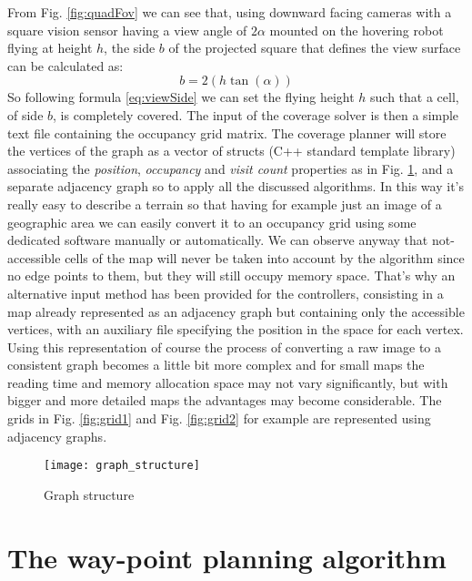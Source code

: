 From Fig. \ref{fig:quadFov} we can see that, using downward facing cameras with a square vision sensor having a view angle of $2\alpha$ mounted on the hovering robot flying at height $h$, the side $b$ of the projected square that defines the view surface can be calculated as:
\begin{equation}
b = 2(h \tan(\alpha))
\label{eq:viewSide}
\end{equation}
So following formula \ref{eq:viewSide} we can set the flying height $h$ such that a cell, of side $b$, is completely covered. 
The input of the coverage solver is then a simple text file containing the occupancy grid matrix. The coverage planner will store the vertices of the graph as a vector of structs (C++ standard template library) associating the \emph{position}, \emph{occupancy} and \emph{visit count} properties as in Fig. \ref{fig:graph_struct}, and a separate adjacency graph so to apply all the discussed algorithms. In this way it's really easy to describe a terrain so that having for example just an image of a geographic area we can easily convert it to an occupancy grid using some dedicated software manually or automatically. We can observe anyway that not-accessible cells of the map will never be taken into account by the algorithm since no edge points to them, but they will still occupy memory space. That's why an alternative input method has been provided for the controllers, consisting in a map already represented as an adjacency graph but containing only the accessible vertices, with an auxiliary file specifying the position in the space for each vertex. Using this representation of course the process of converting a raw image to a consistent graph becomes a little bit more complex and for small maps the reading time and memory allocation space may not vary significantly, but with bigger and more detailed maps the advantages may become considerable. The grids in Fig. \ref{fig:grid1} and Fig. \ref{fig:grid2} for example are represented using adjacency graphs.

\begin{figure}[H]
\centering
\texttt{[image: graph\_structure]}
\caption{Graph structure}
\label{fig:graph_struct}
\end{figure}

\section{The way-point planning algorithm}

